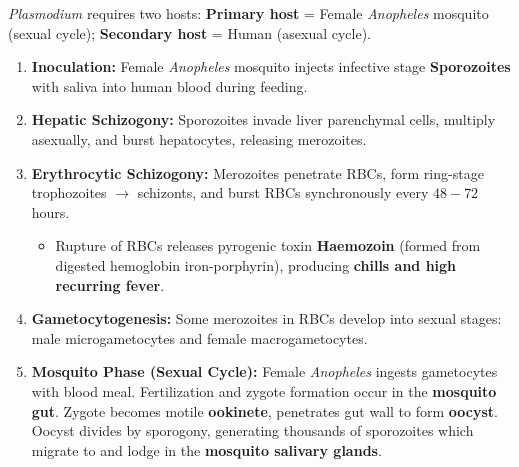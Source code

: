 \documentclass[10pt,a4paper]{article}
\begin{document}
\begin{conceptbox}
\textit{Plasmodium} requires two hosts: \textbf{Primary host} = Female \textit{Anopheles} mosquito (sexual cycle); \textbf{Secondary host} = Human (asexual cycle).
\begin{enumerate}[leftmargin=*]
  \item \textbf{Inoculation:} Female \textit{Anopheles} mosquito injects infective stage \textbf{Sporozoites} with saliva into human blood during feeding.
  \item \textbf{Hepatic Schizogony:} Sporozoites invade liver parenchymal cells, multiply asexually, and burst hepatocytes, releasing merozoites.
  \item \textbf{Erythrocytic Schizogony:} Merozoites penetrate RBCs, form ring-stage trophozoites $\to$ schizonts, and burst RBCs synchronously every $48-72$ hours.
  \begin{itemize}
    \item Rupture of RBCs releases pyrogenic toxin \textbf{Haemozoin} (formed from digested hemoglobin iron-porphyrin), producing \textbf{chills and high recurring fever}.
  \end{itemize}
  \item \textbf{Gametocytogenesis:} Some merozoites in RBCs develop into sexual stages: male microgametocytes and female macrogametocytes.
  \item \textbf{Mosquito Phase (Sexual Cycle):} Female \textit{Anopheles} ingests gametocytes with blood meal. Fertilization and zygote formation occur in the \textbf{mosquito gut}. Zygote becomes motile \textbf{ookinete}, penetrates gut wall to form \textbf{oocyst}. Oocyst divides by sporogony, generating thousands of sporozoites which migrate to and lodge in the \textbf{mosquito salivary glands}.
\end{enumerate}
\end{conceptbox}
\end{document}
